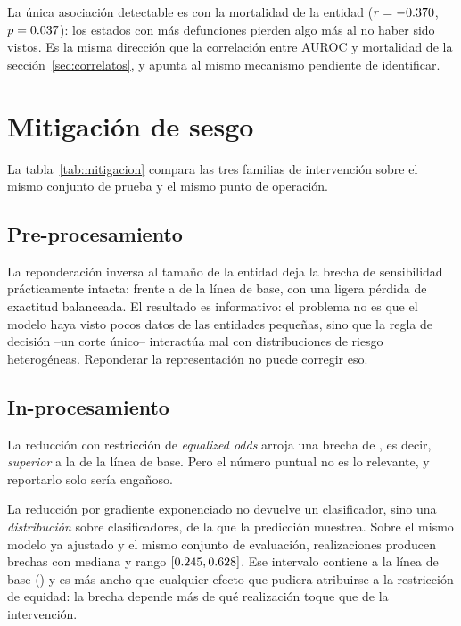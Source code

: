 La única asociación detectable es con la mortalidad de la entidad
($r=-0.370$, $p=0.037$): los estados con más defunciones pierden
algo más al no haber sido vistos. Es la misma dirección que la correlación entre
AUROC y mortalidad de la sección~\ref{sec:correlatos}, y apunta al mismo
mecanismo pendiente de identificar.


\section{Mitigación de sesgo}
\label{sec:mitigacion_res}

La tabla~\ref{tab:mitigacion} compara las tres familias de intervención sobre el
mismo conjunto de prueba y el mismo punto de operación.



\subsection{Pre-procesamiento}

La reponderación inversa al tamaño de la entidad deja la brecha de sensibilidad
prácticamente intacta: \gapPre{} frente a \gapBase{} de la línea de base, con una
ligera pérdida de exactitud balanceada. El resultado es informativo: el problema
no es que el modelo haya visto pocos datos de las entidades pequeñas, sino que la
regla de decisión --un corte único-- interactúa mal con distribuciones de riesgo
heterogéneas. Reponderar la representación no puede corregir eso.

\subsection{In-procesamiento}

La reducción con restricción de \emph{equalized odds} arroja una brecha de
\gapIn, es decir, \emph{superior} a la de la línea de base. Pero el número
puntual no es lo relevante, y reportarlo solo sería engañoso.

La reducción por gradiente exponenciado no devuelve un clasificador, sino una
\emph{distribución} sobre clasificadores, de la que la predicción muestrea. Sobre
el mismo modelo ya ajustado y el mismo conjunto de evaluación,
\inRealizaciones{} realizaciones producen brechas con mediana \inMediana{} y
rango $[0.245, 0.628]$. Ese intervalo contiene a la línea de base
(\gapBase) y es más ancho que cualquier efecto que pudiera atribuirse a la
restricción de equidad: la brecha depende más de qué realización toque que de la
intervención.

